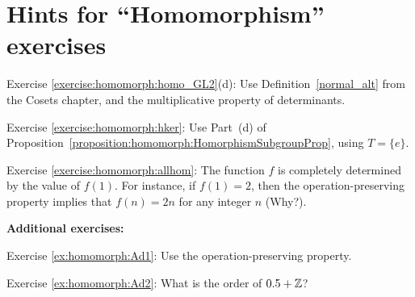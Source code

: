 \section{Hints for ``Homomorphism'' exercises}\label{sec:homomorph:hints} 


\noindent Exercise \ref{exercise:homomorph:homo_GL2}(d): 
Use Definition~\ref{normal_alt} from the Cosets chapter, and the multiplicative property of determinants.

\noindent Exercise \ref{exercise:homomorph:hker}:   Use Part~(d) of Proposition~\ref{proposition:homomorph:HomorphismSubgroupProp}, using  $T=\{e\}$.

\noindent Exercise \ref{exercise:homomorph:allhom}: 
The function $f$ is completely determined by the value of $f(1)$.  For instance, if $f(1)=2$, then the operation-preserving property implies that $f(n)=2n$ for any integer $n$ (Why?).
\bigskip

\textbf{Additional exercises:}

\noindent Exercise \ref{ex:homomorph:Ad1}:  Use the operation-preserving property.

\noindent Exercise \ref{ex:homomorph:Ad2}: What is the order of $0.5 + \mathbb{Z}$?

